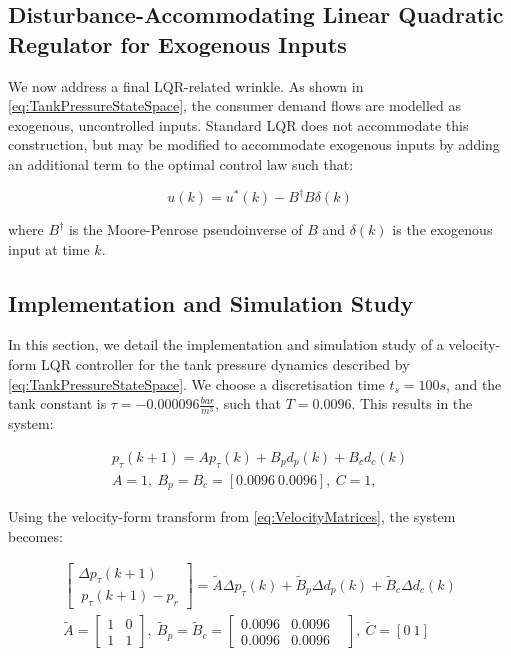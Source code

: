 \subsection{Disturbance-Accommodating Linear Quadratic Regulator for Exogenous Inputs}\label{subsec:DALQR}

We now address a final LQR-related wrinkle. As shown in \cref{eq:TankPressureStateSpace}, the consumer demand flows are modelled as exogenous, uncontrolled inputs. Standard LQR does not accommodate this construction, but may be modified to accommodate exogenous inputs by adding an additional term to the optimal control law \cite{Singh2017} such that:


\begin{equation}\label{eq:ELQRControlLaw}
	u(k) = u^*(k) - B^\dagger B \delta(k)
\end{equation}

where $B^\dagger$ is the Moore-Penrose pseudoinverse of $B$ and $\delta(k)$ is the exogenous input at time $k$.

\subsection{Implementation and Simulation Study}\label{subsec:LQRSimulationStudy}

In this section, we detail the implementation and simulation study of a velocity-form LQR controller for the tank pressure dynamics described by \cref{eq:TankPressureStateSpace}. We choose a discretisation time $t_s = 100 \si{s}$, and the tank constant is $\tau = -0.000096 \frac{\si{bar}}{\si{m^3}}$, such that $T = 0.0096$. This results in the system:

\begin{equation}\label{eq:TankPressureMatrices}
	\begin{gathered}
		p_\tau(k+1) = A p_\tau(k) + B_p d_p(k) + B_c d_c(k)  \\
		A = 1, \ B_p = B_c = [0.0096 \ 0.0096], \ C = 1 ,
	\end{gathered}
\end{equation}

Using the velocity-form transform from \cref{eq:VelocityMatrices}, the system becomes:

\begin{equation}\label{eq:TankPressureVelocityMatrices}
\begin{gathered}
	 \begin{bmatrix}\Delta	p_\tau(k+1) \\\ p_\tau(k+1)-p_{r}
	\end{bmatrix} = \tilde{A} \Delta p_\tau(k) + \tilde{B}_p \Delta d_p(k) + \tilde{B}_c \Delta d_c(k)  \\
	\tilde{A} = \begin{bmatrix} 1 & 0 \\ 1 & 1 \end{bmatrix},
	 \ \tilde{B}_p = \tilde{B}_c = \begin{bmatrix} 0.0096 & 0.0096 & \\ 0.0096 & 0.0096\end{bmatrix}, \ \tilde{C} = [0 \ 1]	
\end{gathered}
\end{equation}

